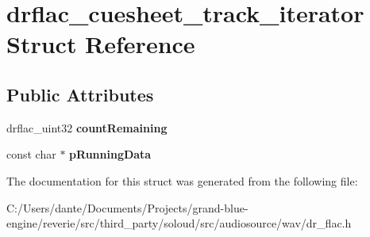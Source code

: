 \hypertarget{structdrflac__cuesheet__track__iterator}{}\section{drflac\+\_\+cuesheet\+\_\+track\+\_\+iterator Struct Reference}
\label{structdrflac__cuesheet__track__iterator}
\subsection*{Public Attributes}
\begin{DoxyCompactItemize}
\item 
\mbox{\label{structdrflac__cuesheet__track__iterator_ae2bdeb50d14b37c469cab1722255b31c}} 
drflac\+\_\+uint32 {\bfseries count\+Remaining}
\item 
\mbox{\label{structdrflac__cuesheet__track__iterator_af31dbd17feeb7f8a2d11f3440f95b368}} 
const char $\ast$ {\bfseries p\+Running\+Data}
\end{DoxyCompactItemize}


The documentation for this struct was generated from the following file\+:\begin{DoxyCompactItemize}
\item 
C\+:/\+Users/dante/\+Documents/\+Projects/grand-\/blue-\/engine/reverie/src/third\+\_\+party/soloud/src/audiosource/wav/dr\+\_\+flac.\+h\end{DoxyCompactItemize}
